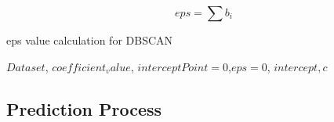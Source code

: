 \documentclass[12pt]{report}
\begin{document}
\begin{equation}
\label{eq:totalepsCalculation}
 eps=\sum{b_{i}}
\end{equation}

\begin{algorithm}
	\caption{eps value calculation for DBSCAN}
	\label{eps_calculation_algorithm}
		\begin{algorithmic}[1]
			\REQUIRE  $ Dataset$, $coefficient_value$, $interceptPoint=0$,$eps=0$, $intercept, c$
				
				\ENDFOR
		\end{algorithmic}
	\end{algorithm}
	
	
	
\subsection{Prediction Process}

%
%
\end{document}
